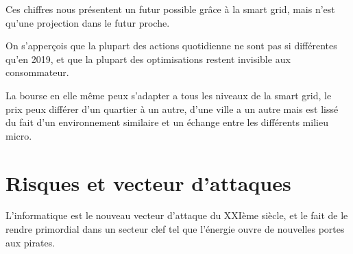 Ces chiffres nous présentent un futur possible grâce à la smart grid, mais n'est qu'une projection dans le futur proche.

On s'apperçois que la plupart des actions quotidienne ne sont pas si différentes qu'en 2019, et que la plupart des
optimisations restent invisible aux consommateur.

La bourse en elle même peux s'adapter a tous les niveaux de la smart grid, le prix peux différer d'un quartier à un autre,
d'une ville a un autre mais est lissé du fait d'un environnement similaire et un échange entre les différents milieu micro.

\section{Risques et vecteur d'attaques}

L'informatique est le nouveau vecteur d'attaque du XXIème siècle, et le fait de le rendre primordial
dans un secteur clef tel que l'énergie ouvre de nouvelles portes aux pirates.
